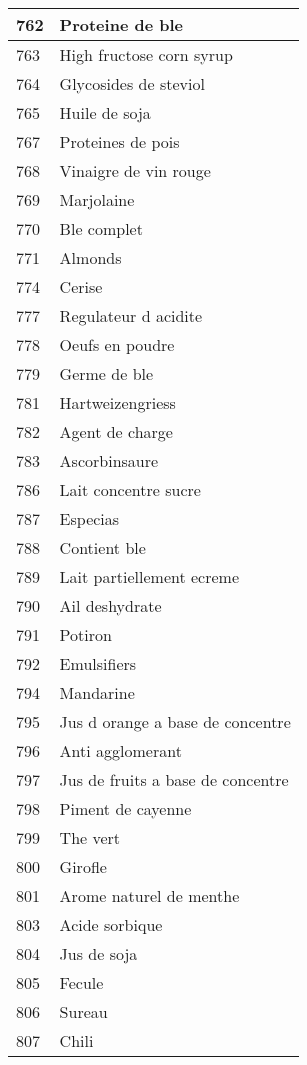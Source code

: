 \begin{longtable}{|l|l|}
762 & Proteine de ble \\ \hline 
763 & High fructose corn syrup \\ \hline 
764 & Glycosides de steviol \\ \hline 
765 & Huile de soja \\ \hline 
767 & Proteines de pois \\ \hline 
768 & Vinaigre de vin rouge \\ \hline 
769 & Marjolaine \\ \hline 
770 & Ble complet \\ \hline 
771 & Almonds \\ \hline 
774 & Cerise \\ \hline 
777 & Regulateur d acidite \\ \hline 
778 & Oeufs en poudre \\ \hline 
779 & Germe de ble \\ \hline 
781 & Hartweizengriess \\ \hline 
782 & Agent de charge \\ \hline 
783 & Ascorbinsaure \\ \hline 
786 & Lait concentre sucre \\ \hline 
787 & Especias \\ \hline 
788 & Contient ble \\ \hline 
789 & Lait partiellement ecreme \\ \hline 
790 & Ail deshydrate \\ \hline 
791 & Potiron \\ \hline 
792 & Emulsifiers \\ \hline 
794 & Mandarine \\ \hline 
795 & Jus d orange a base de concentre \\ \hline 
796 & Anti agglomerant \\ \hline 
797 & Jus de fruits a base de concentre \\ \hline 
798 & Piment de cayenne \\ \hline 
799 & The vert \\ \hline 
800 & Girofle \\ \hline 
801 & Arome naturel de menthe \\ \hline 
803 & Acide sorbique \\ \hline 
804 & Jus de soja \\ \hline 
805 & Fecule \\ \hline 
806 & Sureau \\ \hline 
807 & Chili \\ \hline 

\end{longtable}
